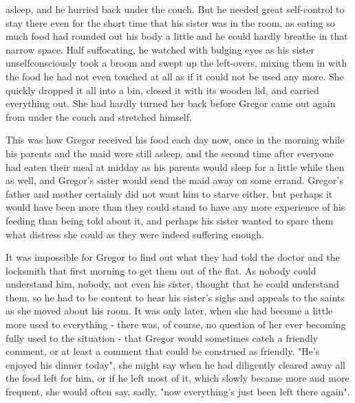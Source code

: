 asleep, and he hurried back under the couch. But he needed great self-control to stay there even for the short time that his sister was in the room, as eating so much food had rounded out his body a little and he could hardly breathe in that narrow space. Half suffocating, he watched with bulging eyes as his sister unselfconsciously took a broom and swept up the left-overs, mixing them in with the food he had not even touched at all as if it could not be used any more. She quickly dropped it all into a bin, closed it with its wooden lid, and carried everything out. She had hardly turned her back before Gregor came out again from under the couch and stretched himself.

This was how Gregor received his food each day now, once in the morning while his parents and the maid were still asleep, and the second time after everyone had eaten their meal at midday as his parents would sleep for a little while then as well, and Gregor's sister would send the maid away on some errand. Gregor's father and mother certainly did not want him to starve either, but perhaps it would have been more than they could stand to have any more experience of his feeding than being told about it, and perhaps his sister wanted to spare them what distress she could as they were indeed suffering enough.

It was impossible for Gregor to find out what they had told the doctor and the locksmith that first morning to get them out of the flat. As nobody could understand him, nobody, not even his sister, thought that he could understand them, so he had to be content to hear his sister's sighs and appeals to the saints as she moved about his room. It was only later, when she had become a little more used to everything - there was, of course, no question of her ever becoming fully used to the situation - that Gregor would sometimes catch a friendly comment, or at least a comment that could be construed as friendly. "He's enjoyed his dinner today", she might say when he had diligently cleared away all the food left for him, or if he left most of it, which slowly became more and more frequent, she would often say, sadly, "now everything's just been left there again".

